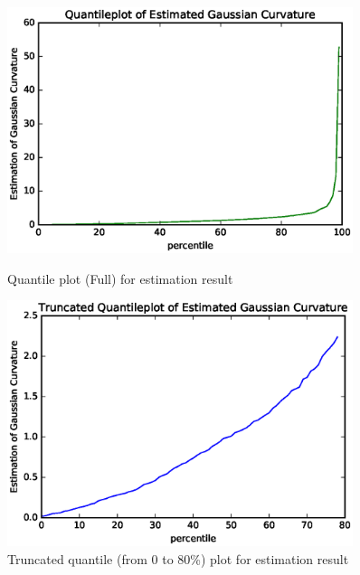 \documentclass{article}
\begin{document}
\begin{figure}[htbp]
\centering
\begin{minipage}{0.45\textwidth}
\includegraphics[width=0.9\textwidth]{Quantileplot-size-1000-epsilon-35.eps}
\caption{Quantile plot (Full) for estimation result}
\label{qp1000}
\end{minipage}
\begin{minipage}{0.45\textwidth}
\includegraphics[width=0.9\textwidth]{Trun-Quantileplot-size-1000-epsilon-35.eps}
\caption{Truncated quantile (from 0 to 80\%) plot for estimation result}
\label{tqp1000}
\end{minipage}
\end{figure}
\end{document}

